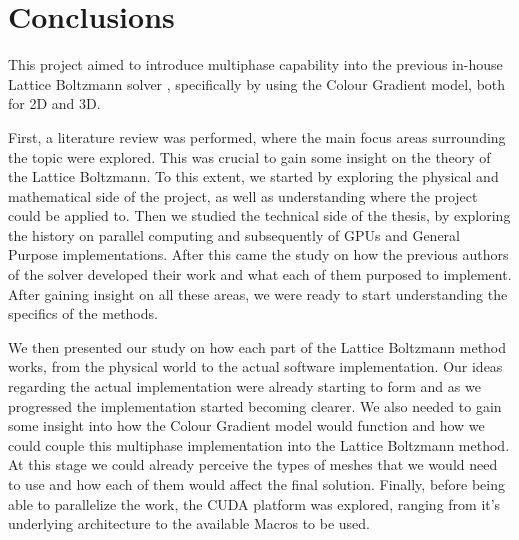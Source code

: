 \documentclass[12pt, openany]{book}
\begin{document}
\chapter{Conclusions}
This project aimed to introduce multiphase capability into the previous in-house Lattice Boltzmann solver \cite{maciej_thesis,koleszar_thesis,jozsa_thesis,szoke_thesis}, specifically by using the Colour Gradient model, both for 2D and 3D. \par
First, a literature review was performed, where the main focus areas surrounding the topic were explored. This was crucial to gain some insight on the theory of the Lattice Boltzmann. To this extent, we started by exploring the physical and mathematical side of the project, as well as understanding where the project could be applied to. Then we studied the technical side of the thesis, by exploring the history on parallel computing and subsequently of GPUs and General Purpose implementations. After this came the study on how the previous authors of the solver developed their work and what each of them purposed to implement. After gaining insight on all these areas, we were ready to start understanding the specifics of the methods. \par
We then presented our study on how each part of the Lattice Boltzmann method works, from the physical world to the actual software implementation. Our ideas regarding the actual implementation were already starting to form and as we progressed the implementation started becoming clearer. We also needed to gain some insight into how the Colour Gradient model would function and how we could couple this multiphase implementation into the Lattice Boltzmann method. At this stage we could already perceive the types of meshes that we would need to use and how each of them would affect the final solution. Finally, before being able to parallelize the work, the CUDA platform was explored, ranging from it's underlying architecture to the available Macros to be used. \par
\end{document}
